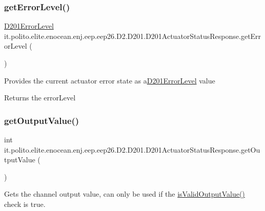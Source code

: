 \subsubsection{\texorpdfstring{get\+Error\+Level()}{getErrorLevel()}}
{\footnotesize\ttfamily \hyperlink{enumit_1_1polito_1_1elite_1_1enocean_1_1enj_1_1eep_1_1eep26_1_1_d2_1_1_d201_1_1_d201_error_level}{D201\+Error\+Level} it.\+polito.\+elite.\+enocean.\+enj.\+eep.\+eep26.\+D2.\+D201.\+D201\+Actuator\+Status\+Response.\+get\+Error\+Level (\begin{DoxyParamCaption}{ }\end{DoxyParamCaption})}

Provides the current actuator error state as a\hyperlink{enumit_1_1polito_1_1elite_1_1enocean_1_1enj_1_1eep_1_1eep26_1_1_d2_1_1_d201_1_1_d201_error_level}{D201\+Error\+Level} value

\begin{DoxyReturn}{Returns}
the error\+Level 
\end{DoxyReturn}
\hypertarget{classit_1_1polito_1_1elite_1_1enocean_1_1enj_1_1eep_1_1eep26_1_1_d2_1_1_d201_1_1_d201_actuator_status_response_a2e1c6ba08f17cf99eb0095216e9a6537}{}\label{classit_1_1polito_1_1elite_1_1enocean_1_1enj_1_1eep_1_1eep26_1_1_d2_1_1_d201_1_1_d201_actuator_status_response_a2e1c6ba08f17cf99eb0095216e9a6537} 
\subsubsection{\texorpdfstring{get\+Output\+Value()}{getOutputValue()}}
{\footnotesize\ttfamily int it.\+polito.\+elite.\+enocean.\+enj.\+eep.\+eep26.\+D2.\+D201.\+D201\+Actuator\+Status\+Response.\+get\+Output\+Value (\begin{DoxyParamCaption}{ }\end{DoxyParamCaption})}

Gets the channel output value, can only be used if the {\ttfamily \hyperlink{classit_1_1polito_1_1elite_1_1enocean_1_1enj_1_1eep_1_1eep26_1_1_d2_1_1_d201_1_1_d201_actuator_status_response_a4bbde15a318d004a1bbb8f6ed8df8bc9}{is\+Valid\+Output\+Value()}} check is true.

